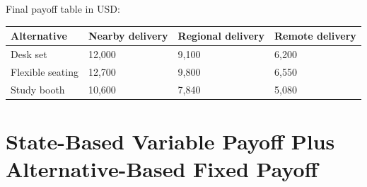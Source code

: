 Final payoff table in USD:
\begin{center}
\begin{tabular}{llll}
\toprule
Alternative & Nearby delivery & Regional delivery & Remote delivery \\
\midrule
Desk set & 12{,}000 & 9{,}100 & 6{,}200 \\
Flexible seating & 12{,}700 & 9{,}800 & 6{,}550 \\
Study booth & 10{,}600 & 7{,}840 & 5{,}080 \\
\bottomrule
\end{tabular}
\end{center}
\section{State-Based Variable Payoff Plus Alternative-Based Fixed Payoff}
\label{sec:state-based-variable-payoff-plus-alternative-based-fixed-payoff}
